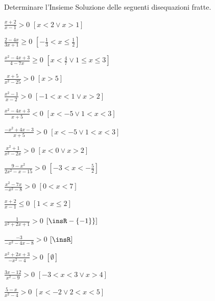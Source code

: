 
\begin{esercizio}[\Ast]
 \label{ese:4.58}
Determinare l'Insieme Soluzione delle seguenti disequazioni fratte.
\begin{multicols}{2}
\begin{enumeratea}
\item $\frac{x+2}{x-1}>0$ \hfill $\left[x<2\vee x>1\right]$
\item $\frac{2-4x}{3x+1}\ge 0$ \hfill $\left[-\frac 1 3<x\le \frac 1 2\right]$
\item $\frac{x^2-4x+3}{4-7x}\ge 0$ 
 \hfill $\left[x<\frac 4 7\vee 1\le x\le 3\right]$
\item $\frac{x+5}{x^2-25}>0$ \hfill $\left[x>5\right]$
\item $\frac{x^2-1}{x-2}>0$ \hfill $\left[-1<x<1\vee x>2\right]$
\item $\frac{x^2-4x+3}{x+5}<0$ \hfill $\left[x<-5\vee 1<x<3\right]$
\item $\frac{-x^2+4x-3}{x+5}>0$ \hfill $\left[x<-5\vee 1<x<3\right]$
\item $\frac{x^2+1}{x^2-2x}>0$ \hfill $\left[x<0\vee x>2\right]$
\item $\frac{9-x^2}{2x^2-x-15}>0$ \hfill $\left[-3<x<-\frac 5 2\right]$
\item $\frac{x^2-7x}{-x^2-8}>0$ \hfill $\left[0<x<7\right]$
\item $\frac{x+2}{x-1}\le 0$ \hfill $\left[1< x\le 2\right]$
\item $\frac 1{x^2+2x+1}>0$ \hfill $\left[\insR-\{-1\}\}\right]$
\item $\frac{-3}{-x^2-4x-8}>0$ \hfill $\left[\insR\right]$
\item $\frac{x^2+2x+3}{-x^2-4}>0$ \hfill $\left[\emptyset\right]$
\item $\frac{3x-12}{x^2-9}>0$ \hfill $\left[-3<x<3\vee x>4\right]$
\item $\frac{5-x}{x^2-4}>0$ \hfill $\left[x<-2\vee 2<x<5\right]$
\end{enumeratea}
\end{multicols}
\end{esercizio}


